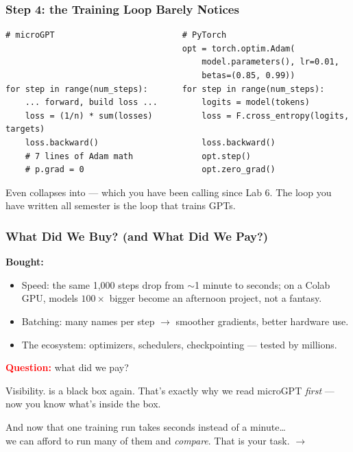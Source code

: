 \begin{frame}[fragile]
    \frametitle{Step 4: the Training Loop Barely Notices}

\begin{lstlisting}
# microGPT                          # PyTorch
                                    opt = torch.optim.Adam(
                                        model.parameters(), lr=0.01,
                                        betas=(0.85, 0.99))
for step in range(num_steps):       for step in range(num_steps):
    ... forward, build loss ...         logits = model(tokens)
    loss = (1/n) * sum(losses)          loss = F.cross_entropy(logits, targets)
    loss.backward()                     loss.backward()
    # 7 lines of Adam math              opt.step()
    # p.grad = 0                        opt.zero_grad()
\end{lstlisting}

    \pause

    Even  collapses into  --- which you have been calling since Lab 6. The loop you have written all semester \alert{is} the loop that trains GPTs.
\end{frame}

\begin{frame}
    \frametitle{What Did We Buy? (and What Did We Pay?)}

    \textbf{Bought:}
    \begin{itemize}
        \item \alert{Speed}: the same 1{,}000 steps drop from $\sim$1 minute to \alert{seconds}; on a Colab GPU, models $100\times$ bigger become an afternoon project, not a fantasy.
        \item \alert{Batching}: many names per step $\to$ smoother gradients, better hardware use.
        \item \alert{The ecosystem}: optimizers, schedulers, checkpointing --- tested by millions.
    \end{itemize}

    \pause

    \textcolor{red}{\textbf{Question:}} what did we pay?

    \pause

    \alert{Visibility.}  is a black box again. That's exactly why we read microGPT \emph{first} --- now you know what's inside the box.

    \pause

    \begin{center}
        And now that one training run takes \alert{seconds instead of a minute}\dots\\
        we can afford to run \alert{many} of them and \emph{compare}. That is your task. $\to$
    \end{center}
\end{frame}
